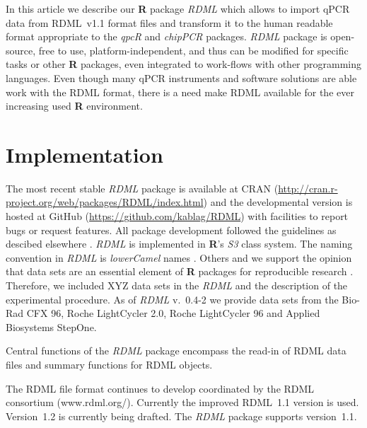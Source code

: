 \documentclass{bioinfo}
\begin{document}
In this article we describe our \textbf{R} package \textit{RDML} which allows to 
import qPCR data from RDML~v1.1 format files and transform it to the human 
readable format appropriate to the \textit{qpcR} and \textit{chipPCR} packages. 
\textit{RDML} package is open-source, free to use, platform-independent, and 
thus can be modified for specific tasks or other \textbf{R} packages, even 
integrated to work-flows with other programming languages. Even though many qPCR 
instruments and software solutions are able work with the RDML format, there is 
a need make RDML available for the ever increasing used \textbf{R} environment.

\section{Implementation}

The most recent stable \textit{RDML} package is available at CRAN 
(\url{http://cran.r-project.org/web/packages/RDML/index.html}) and the 
developmental version is hosted at GitHub (\url{https://github.com/kablag/RDML}) 
with facilities to report bugs or request features. All package development 
followed the guidelines as descibed elsewhere \cite{RDCT2014a}. \textit{RDML} is 
implemented in \textbf{R}’s \emph{S3} class system. The naming convention in 
\textit{RDML} is \textit{lowerCamel} names \cite{Baaaath_2012}. Others and we 
support the opinion that data sets are an essential element of \textbf{R} 
packages for reproducible research 
\cite{gentleman_2004,hofmann_2013,Leeper_2014}. Therefore, we included XYZ data 
sets in the \textit{RDML} and the description of the experimental procedure. As 
of \textit{RDML} v.~0.4-2 we provide data sets from the Bio-Rad CFX 96, Roche 
LightCycler 2.0, Roche LightCycler 96 and Applied Biosystems StepOne.

Central functions of the \textit{RDML} package encompass the read-in of RDML 
data files and summary functions for RDML objects.

The RDML file format continues to develop coordinated by the RDML consortium 
(www.rdml.org/). Currently the improved RDML~1.1 version is used. Version~1.2 is 
currently being drafted. The \textit{RDML} package supports version~1.1.
\end{document}
